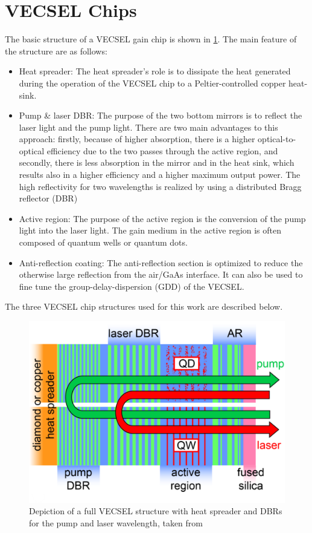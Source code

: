 \section{VECSEL Chips}\label{sec:vecsel}

The basic structure of a VECSEL gain chip is shown in \cref{fig:vecDes}. The main feature of the structure are as follows: 

\begin{itemize}
    \item Heat spreader: The heat spreader's role is to dissipate the heat generated during the operation of the VECSEL chip to a Peltier-controlled copper heat-sink.
    \item Pump \& laser  DBR: The purpose of the two bottom mirrors is to reflect the laser light and the pump light. There are two main advantages to this approach: firstly, because of higher absorption, there is a higher optical-to-optical efficiency due to the two passes through the active region, and secondly, there is less absorption in the mirror and in the heat sink, which results also in a higher efficiency and a higher maximum output power. The high reflectivity for two wavelengths is realized by using a distributed Bragg reflector (DBR)
    \item Active region: The purpose of the active region is the conversion of the pump light into the laser light. The gain medium in the active region is often composed of quantum wells or quantum dots.
    \item Anti-reflection coating: The anti-reflection section is optimized to reduce the otherwise large reflection from the air/GaAs interface. It can also be used to fine tune the group-delay-dispersion (GDD) of the VECSEL.
\end{itemize}

The three VECSEL chip structures used for this work are described below.

\begin{figure}[ht]
    \centering
    \includegraphics[width=.6\linewidth]{images/VECSEL_structure.png}
    \caption{Depiction of a full VECSEL structure with heat spreader and DBRs for the pump and laser wavelength, taken from \cite{Mangold2012VECSELCharacterization}}
    \label{fig:vecDes}
\end{figure}

